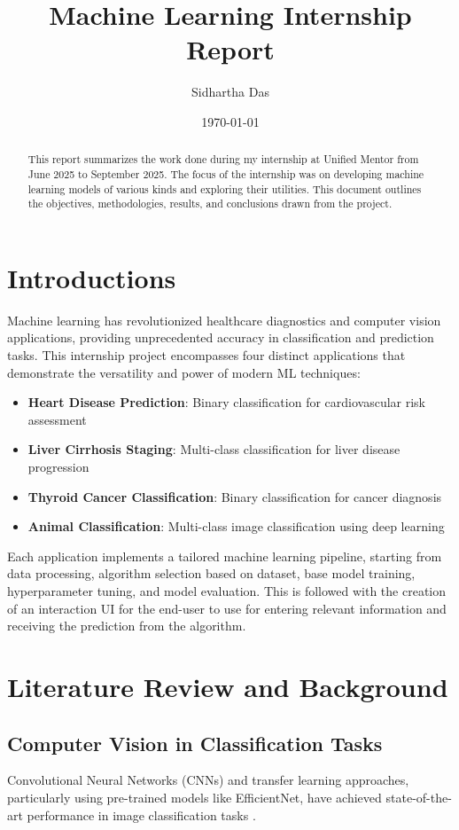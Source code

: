\documentclass[12pt, a4paper]{article}
\title{\textbf{Machine Learning Internship Report}}
\author{Sidhartha Das}
\date{\today}
\begin{document}
\maketitle

\begin{abstract}
This report summarizes the work done during my internship at Unified Mentor from June 2025 to September 2025. The focus of the internship was on developing machine learning models of various kinds and exploring their utilities. This document outlines the objectives, methodologies, results, and conclusions drawn from the project.
\end{abstract}

\newpage
\tableofcontents
\newpage

\section{Introductions}


Machine learning has revolutionized healthcare diagnostics and computer vision applications, providing unprecedented accuracy in classification and prediction tasks. This internship project encompasses four distinct applications that demonstrate the versatility and power of modern ML techniques:

\begin{itemize}
    \item \textbf{Heart Disease Prediction}: Binary classification for cardiovascular risk assessment
    \item \textbf{Liver Cirrhosis Staging}: Multi-class classification for liver disease progression
    \item \textbf{Thyroid Cancer Classification}: Binary classification for cancer diagnosis
    \item \textbf{Animal Classification}: Multi-class image classification using deep learning
\end{itemize}

Each application implements a tailored machine learning pipeline, starting from data processing, algorithm selection based on dataset, base model training, hyperparameter tuning, and model evaluation. This is followed with the creation of an interaction UI for the end-user to use for entering relevant information and receiving the prediction from the algorithm.

\section{Literature Review and Background}

\subsection{Computer Vision in Classification Tasks}
Convolutional Neural Networks (CNNs) and transfer learning approaches, particularly using pre-trained models like EfficientNet, have achieved state-of-the-art performance in image classification tasks \cite{efficientnet}.
\end{document}
